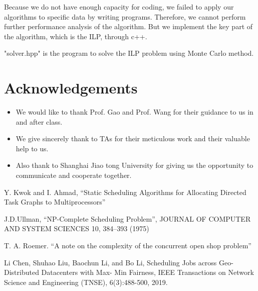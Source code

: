 \documentclass{llncs}
\begin{document}
Because we do not have enough capacity for coding, we failed to apply our algorithms to specific data by writing programs. Therefore, we cannot perform further performance analysis of the algorithm. But we implement the key part of the algorithm, which is the ILP, through c++. 

"solver.hpp" is the program to solve the ILP problem using Monte Carlo method. 







\section*{Acknowledgements}
\begin{itemize}
    \item We would like to thank Prof. Gao and Prof. Wang for their guidance to us in and after class.

    \item We give sincerely thank to TAs for their meticulous work and their valuable help to us.
    
    \item Also thank to Shanghai Jiao tong University for giving us the opportunity to communicate and cooperate together.
\end{itemize}


%
%
%
% 
% 
%
\begin{thebibliography}{8}

Y. Kwok and I. Ahmad, “Static Scheduling Algorithms for Allocating Directed Task Graphs to Multiprocessors”

J.D.Ullman, “NP-Complete Scheduling Problem”, JOURNAL OF COMPUTER AND SYSTEM SCIENCES 10, 384--393 (1975)

T. A. Roemer.  “A note on the complexity of the concurrent open shop problem”

Li Chen, Shuhao Liu, Baochun Li, and Bo Li, Scheduling Jobs across Geo-Distributed Datacenters with Max-
Min Fairness, IEEE Transactions on Network Science and Engineering (TNSE), 6(3):488-500, 2019.

\end{thebibliography}
\end{document}
